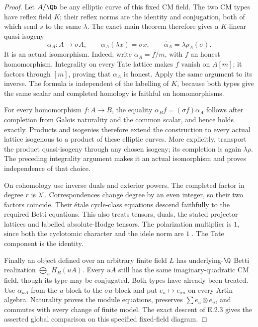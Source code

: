 \begin{proof}
Let \(A/\Qb\) be any elliptic curve of this fixed CM field.
The two CM types have reflex field \(K\); their reflex
norms are the identity and conjugation, both of which
send \(s\) to the same \(\lambda\).
The exact main theorem
\cite[Theorem 9.10, p.~78]{GenMilneCM2020} therefore gives
a \(K\)-linear quasi-isogeny
\[
 \alpha_A:A\longrightarrow\sigma A,\qquad
 \alpha_A(\lambda x)=\sigma x,
 \qquad
 \widehat\alpha_A=\lambda\rho_A(\sigma).
 \tag{E.2.19c}
\]
It is an actual isomorphism. Indeed, write
\(\alpha_A=f/m\), with \(f\) an honest homomorphism.
Integrality on every Tate lattice makes \(f\) vanish
on \(A[m]\); it factors through \([m]\), proving that
\(\alpha_A\) is honest. Apply the same argument to
its inverse. The formula is independent of the labelling
of \(K\), because both types give the same scalar and
completed homology is faithful on homomorphisms.

For every homomorphism \(f:A\to B\), the equality
\(\alpha_Bf=(\sigma f)\alpha_A\) follows after completion
from Galois naturality and the common scalar, and hence
holds exactly. Products and isogenies therefore extend
the construction to every actual lattice isogenous to
a product of these elliptic curves. More explicitly,
transport the product quasi-isogeny through any chosen
isogeny; its completion is again \(\lambda\rho\).
The preceding integrality argument makes it an actual
isomorphism and proves independence of that choice.

On cohomology use inverse duals and exterior powers.
The completed factor in degree \(r\) is \(\lambda^r\).
Correspondences change degree by an even integer, so
their two factors coincide. Their étale cycle-class
equations descend faithfully to the required Betti
equations. This also treats tensors, duals, the stated
projector lattices and labelled absolute-Hodge tensors.
The polarization multiplier is \(1\), since both the
cyclotomic character and the idele norm are \(1\)
\cite[Remark 9.11(c), p.~78]{GenMilneCM2020}.
The Tate component is the identity.

Finally an object defined over an arbitrary finite
field \(L\) has underlying-\(\Q\) Betti realization
\(\bigoplus_u H_B(uA)\). Every \(uA\) still has the
same imaginary-quadratic CM field, though its type
may be conjugated. Both types have already been
treated. Use \(\alpha_{uA}\) from the \(u\)-block to
the \(\sigma u\)-block and put \(e_u\mapsto e_{\sigma u}\)
on every Artin algebra. Naturality proves the module
equations, preserves \(\sum e_u\otimes e_u\), and
commutes with every change of finite model.
The exact descent of E.2.3 gives the asserted global
comparison on this specified fixed-field diagram.
\end{proof}


